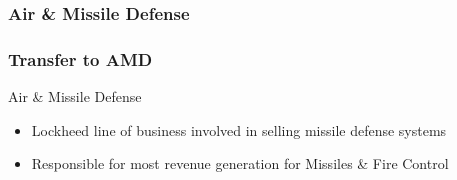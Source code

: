 \documentclass[aspectratio=169]{beamer}
\begin{document}
\subsubsection{Air \& Missile Defense}

\begin{frame}
  \frametitle{Transfer to AMD}
  \begin{block}{Air \& Missile Defense}
    \begin{itemize}
      \item Lockheed line of business involved in selling missile
        defense systems
      \item Responsible for most revenue generation for Missiles \&
        Fire Control
    \end{itemize}
  \end{block}
\end{frame}
\end{document}
